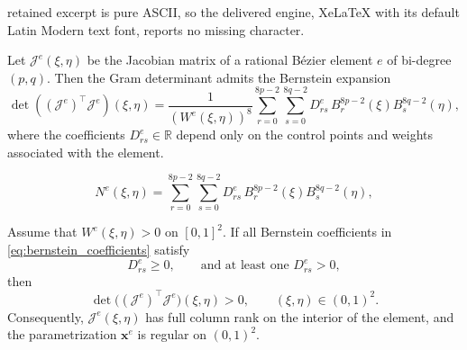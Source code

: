 \documentclass[10pt,a4paper]{amsart}
\begin{document}
retained excerpt is pure ASCII, so the delivered engine, XeLaTeX with its default Latin Modern text font, reports no missing character.
\begin{theorem}
\label{thm:gram-bernstein}
Let $\bm{\mathcal{J}}^e(\xi,\eta)$ be the Jacobian matrix of a rational B\'ezier element $e$ of bi-degree $(p,q)$. Then the Gram determinant admits the Bernstein expansion
\begin{equation}
\det\!\left((\bm{\mathcal{J}}^e)^\top \bm{\mathcal{J}}^e \right)(\xi,\eta)
=
\frac{1}{(W^e(\xi,\eta))^{8}}
\sum_{r=0}^{8p-2}\sum_{s=0}^{8q-2}
D_{rs}^e \, B_r^{8p-2}(\xi) B_s^{8q-2}(\eta),
\label{eq:JeTJe-final}
\end{equation}
where the coefficients $D_{rs}^e\in\mathbb{R}$ depend only on the control points and weights associated with the element.
\end{theorem}

\begin{equation}
N^e(\xi,\eta)
=
\sum_{r=0}^{8p-2}\sum_{s=0}^{8q-2}
D_{rs}^e \, B_r^{8p-2}(\xi) B_s^{8q-2}(\eta),
\label{eq:bernstein_coefficients}
\end{equation}

\begin{theorem}
\label{cor:regularity}
Assume that $W^e(\xi,\eta)>0$ on $[0,1]^2$. 
If all Bernstein coefficients in \eqref{eq:bernstein_coefficients} satisfy
\begin{equation}
D_{rs}^e \ge 0,
\qquad
\text{and at least one } D_{rs}^e > 0,
\end{equation}
then
\begin{equation}
\det\!\big((\bm{\mathcal{J}}^e)^\top\bm{\mathcal{J}}^e\big)(\xi,\eta)>0,
\qquad
(\xi,\eta)\in(0,1)^2.
\end{equation}
Consequently, $\bm{\mathcal{J}}^e(\xi,\eta)$ has full column rank on the interior of the element, and the parametrization $\bm{x}^e$ is regular on $(0,1)^2$.
\end{theorem}
\end{document}
